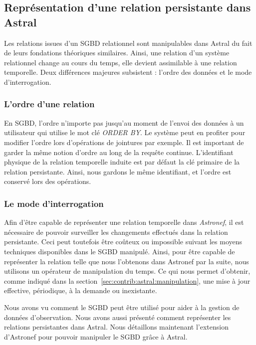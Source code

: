 \subsection{Représentation d'une relation persistante dans Astral}\label{sec:contrib:asteroid:theorie:astral}
Les relations issues d'un SGBD relationnel sont manipulables dans Astral du fait de leurs fondations théoriques similaires. Ainsi, une relation d'un système relationnel change au cours du temps, elle devient assimilable à une relation temporelle. Deux différences majeures subsistent : l'ordre des données et le mode d'interrogation.
\subsubsection{L'ordre d'une relation}
En SGBD, l'ordre n'importe pas jusqu'au moment de l'envoi des données à un utilisateur qui utilise le mot clé \textit{ORDER BY}. Le système peut en profiter pour modifier l'ordre lors d'opérations de jointures par exemple. Il est important de garder la même notion d'ordre au long de la requête continue. L'identifiant physique de la relation temporelle induite est par défaut la clé primaire de la relation persistante. Ainsi, nous gardons le même identifiant, et l'ordre est conservé lors des opérations.

\subsubsection{Le mode d'interrogation}
Afin d'être capable de représenter une relation temporelle dans \textit{Astronef}, il est nécessaire de pouvoir surveiller les changements effectués dans la relation persistante. Ceci peut toutefois être coûteux ou impossible suivant les moyens techniques disponibles dans le SGBD manipulé. Ainsi, pour être capable de représenter la relation telle que nous l'obtenons dans Astronef par la suite, nous utilisons un opérateur de manipulation du temps. Ce qui nous permet d'obtenir, comme indiqué dans la section~\ref{sec:contrib:astral:manipulation}, une mise à jour effective, périodique, à la demande ou inexistante.

Nous avons vu comment le SGBD peut être utilisé pour aider à la gestion de données d'observation. Nous avons aussi présenté comment représenter les relations persistantes dans Astral. Nous détaillons maintenant l'extension d'Astronef pour pouvoir manipuler le SGBD grâce à Astral.

